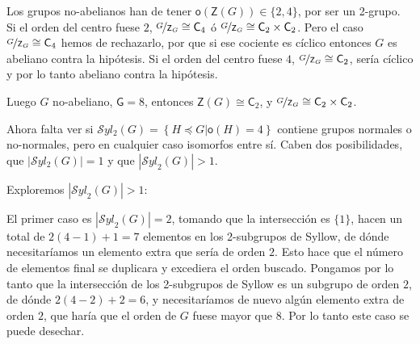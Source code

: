 \documentclass[12pt,a4paper,fleqn,spanish,final,openright]{extbook}
\theoremstyle{definition}
\theoremstyle{remark}
\begin{document}
    Los grupos no-abelianos han de tener $\mathsf{o}\left(\mathsf{Z}(G)\right)    \in \{2,4\}$, por ser un 2-grupo. Si el orden del centro fuese $2$, $\nicefrac{G}{\mathsf{Z}_{G}}   \cong    \mathsf{C}_{4}$ ó $\nicefrac{G}{\mathsf{Z}_{G}}   \cong    \mathsf{C}_{2}   \times   \mathsf{C}_{2}$. Pero el caso $\nicefrac{G}{\mathsf{Z}_{G}}   \cong    \mathsf{C}_{4}$ hemos de rechazarlo, por que si ese cociente es cíclico entonces $G$ es abeliano contra la hipótesis. Si el orden del centro fuese $4$, $\nicefrac{G}{\mathsf{Z}_{G}}   \cong    \mathsf{C}_{2}$, sería cíclico y por lo tanto abeliano contra la hipótesis.

    Luego $G$ no-abeliano, $\mathsf{G}=8$, entonces $\mathsf{Z}\left(G\right)   \cong   \mathsf{C}_{2}$, y $\nicefrac{G}{\mathsf{Z}_{G}}   \cong    \mathsf{C}_{2}   \times   \mathsf{C}_{2}$.

    Ahora falta ver si $\mathcal{S}yl_{2}(G)=\left\lbrace H   \preccurlyeq    G \vert \mathsf{o}(H)=4 \right\rbrace$ contiene grupos normales o no-normales, pero en cualquier caso isomorfos entre sí. Caben dos posibilidades, que $\left| \mathcal{S}yl_2 (G)\right|=1$ y que $\left| {{\mathcal{S}yl}_{2}}(G)\right|>1$.

    Exploremos $\left| {{\mathcal{S}yl}_{2}}(G)\right|>1$:

    El primer caso es $\left| {{\mathcal{S}yl}_{2}}(G)\right|=2$,
tomando que la intersección es $\{1\}$, hacen un total de $2(4-1)+1=7$ elementos
en los 2-subgrupos de Syllow, de dónde necesitaríamos un elemento extra que sería
de orden $2$. Esto hace que el número de elementos final se duplicara y excediera
el orden buscado. Pongamos por lo tanto que la intersección de los 2-subgrupos de
Syllow es un subgrupo de orden $2$, de dónde $2(4-2)+2=6$, y necesitaríamos de nuevo
algún elemento extra de orden $2$, que haría que el orden de $G$ fuese mayor que $8$.
Por lo tanto este caso se puede desechar.
\end{document}
